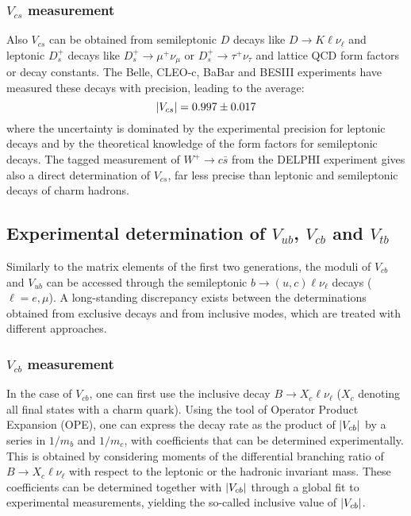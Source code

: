 \documentclass[../../main/main.tex]{subfiles}
\begin{document}
\subsubsection*{\( V_{cs} \) measurement}
Also \( V_{cs} \) can be obtained from semileptonic \( D \) decays like \( D \rightarrow K \ell \nu_{\ell} \) and leptonic \( D^+_s \) decays like \( D^+_s \rightarrow \mu^+ \nu_{\mu} \) or \( D^+_s \rightarrow \tau^+ \nu_{\tau} \) and lattice QCD form factors or decay constants. The Belle, CLEO-c, BaBar and BESIII experiments have measured these decays with precision, leading to the average:
\begin{equation}
	\abs{V_{cs}}
	=
	0.997 \pm 0.017
	\label{eq:}
\end{equation}
where the uncertainty is dominated by the experimental precision for leptonic decays and by the theoretical knowledge of the form factors for semileptonic decays. The tagged measurement of \( W^+ \rightarrow c\bar{s} \) from the DELPHI experiment gives also a direct determination of \( V_{cs} \), far less precise than leptonic and semileptonic decays of charm hadrons.



\subsection{Experimental determination of \( V_{ub} \), \( V_{cb} \) and \( V_{tb} \)}
Similarly to the matrix elements of the first two generations, the moduli of \( V_{cb} \) and \( V_{ub} \) can be accessed through the semileptonic \( b \rightarrow (u,c) \ell \nu_{\ell} \) decays (\( \ell = e, \mu \)). A long-standing discrepancy exists between the determinations obtained from exclusive decays and from inclusive modes, which are treated with different approaches.


\subsubsection*{\( V_{cb} \) measurement}
In the case of \( V_{cb} \), one can first use the inclusive decay \( B \rightarrow X_c \ell \nu_{\ell} \) (\( X_c \) denoting all final states with a charm quark). Using the tool of Operator Product Expansion (OPE), one can express the decay rate as the product of \( \abs{V_{cb}} \) by a series in \( 1/m_b \) and \( 1/m_c \), with coefficients that can be determined experimentally. This is obtained by considering moments of the differential branching ratio of \( B \rightarrow X_c \ell \nu_{\ell} \) with respect to the leptonic or the hadronic invariant mass. These coefficients can be determined together with \( \abs{V_{cb}} \) through a global fit to experimental measurements, yielding the so-called inclusive value of \( \abs{V_{cb}} \).
\end{document}
